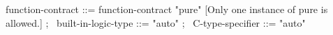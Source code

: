 \begin{syntax}
function-contract ::= function-contract "pure"
 [Only one instance of pure is allowed.] ;
\
built-in-logic-type ::= "auto" ;
\
C-type-specifier ::= "auto" 
\end{syntax}
